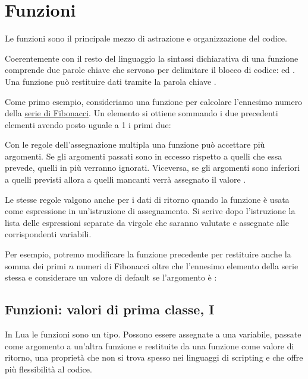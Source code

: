 
\chapter{Funzioni}
\label{chFondFunzioni}

Le funzioni sono il principale mezzo di astrazione e organizzazione del codice.

Coerentemente con il resto del linguaggio la sintassi dichiarativa di una
funzione comprende due parole chiave che servono per delimitare il blocco di
codice:  ed . Una funzione può restituire dati tramite la
parola chiave .

Come primo esempio, consideriamo una funzione per calcolare l'ennesimo numero
della \href{http://it.wikipedia.org/wiki/Successione_di_Fibonacci}{serie di
Fibonacci}. Un elemento si ottiene sommando i due precedenti elementi avendo
posto uguale a 1 i primi due:

Con le regole dell'assegnazione multipla una funzione può accettare più
argomenti. Se gli argomenti passati sono in eccesso rispetto a quelli che essa
prevede, quelli in più verranno ignorati. Viceversa, se gli argomenti sono
inferiori a quelli previsti allora a quelli mancanti verrà assegnato il valore
.

Le stesse regole valgono anche per i dati di ritorno quando la funzione è usata
come espressione in un'istruzione di assegnamento. Si scrive dopo l'istruzione
 la lista delle espressioni separate da virgole che
saranno valutate e assegnate alle corrispondenti variabili.

Per esempio, potremo modificare la funzione precedente per restituire anche la
somma dei primi \( n \) numeri di Fibonacci oltre che l'ennesimo elemento della
serie stessa e considerare un valore di default se l'argomento è :


\section{Funzioni: valori di prima classe, I}

In Lua le funzioni sono un tipo. Possono essere assegnate a una variabile,
passate come argomento a un'altra funzione e restituite da una funzione come
valore di ritorno, una proprietà che non si trova spesso nei linguaggi di
scripting e che offre più flessibilità al codice.

